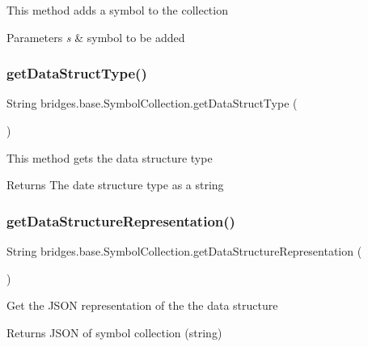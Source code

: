 This method adds a symbol to the collection 
\begin{DoxyParams}{Parameters}
{\em s} & symbol to be added \\
\hline
\end{DoxyParams}
\mbox{\label{classbridges_1_1base_1_1_symbol_collection_afbc928d2e6818edec96d10f52feebacb}} 
\subsubsection{\texorpdfstring{get\+Data\+Struct\+Type()}{getDataStructType()}}
{\footnotesize\ttfamily String bridges.\+base.\+Symbol\+Collection.\+get\+Data\+Struct\+Type (\begin{DoxyParamCaption}{ }\end{DoxyParamCaption})}

This method gets the data structure type

\begin{DoxyReturn}{Returns}
The date structure type as a string 
\end{DoxyReturn}
\mbox{\label{classbridges_1_1base_1_1_symbol_collection_a706ad8a7bcf12c194403ac3281c73674}} 
\subsubsection{\texorpdfstring{get\+Data\+Structure\+Representation()}{getDataStructureRepresentation()}}
{\footnotesize\ttfamily String bridges.\+base.\+Symbol\+Collection.\+get\+Data\+Structure\+Representation (\begin{DoxyParamCaption}{ }\end{DoxyParamCaption})}

Get the J\+S\+ON representation of the the data structure \begin{DoxyReturn}{Returns}
J\+S\+ON of symbol collection (string) 
\end{DoxyReturn}


